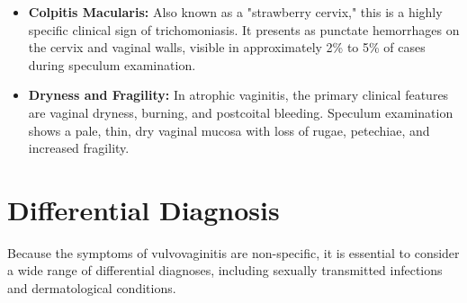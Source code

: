 \begin{itemize}
    \item \textbf{Colpitis Macularis:} Also known as a "strawberry cervix," this is a highly specific clinical sign of trichomoniasis. It presents as punctate hemorrhages on the cervix and vaginal walls, visible in approximately 2\% to 5\% of cases during speculum examination.
    \item \textbf{Dryness and Fragility:} In atrophic vaginitis, the primary clinical features are vaginal dryness, burning, and postcoital bleeding. Speculum examination shows a pale, thin, dry vaginal mucosa with loss of rugae, petechiae, and increased fragility.
\end{itemize}

\section*{Differential Diagnosis}
Because the symptoms of vulvovaginitis are non-specific, it is essential to consider a wide range of differential diagnoses, including sexually transmitted infections and dermatological conditions.
